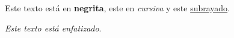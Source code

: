 \documentclass[a4paper, 10pt]{article}
\begin{document}
Este texto está en \textbf{negrita}, este en \textit{cursiva} y este 
\underline{subrayado}. 

\textit{Este texto está \emph{enfatizado}}.
\end{document}
